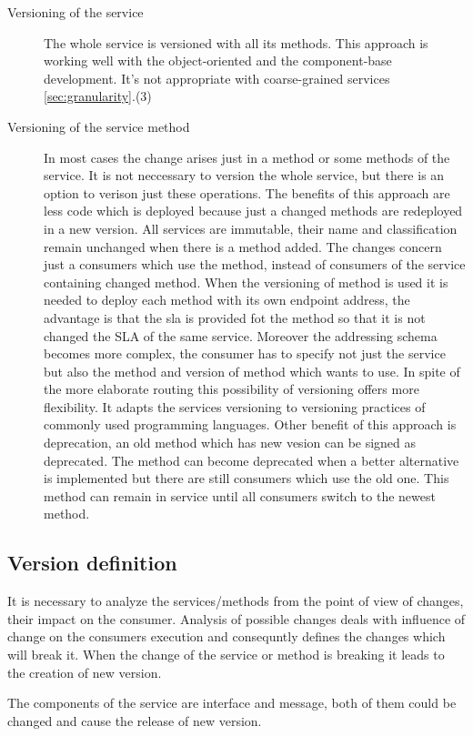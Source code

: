 \begin{description}
  \item[Versioning of the service] 
  The whole service is versioned with all its methods. This approach is working well with the object-oriented and the component-base development. It's not appropriate with coarse-grained services \ref{sec:granularity}.(3)
  \item[Versioning of the service method] 
  In most cases the change arises just in a method or some methods of the service. It is not neccessary to version the whole service, but there is an option to verison just these operations.
  The benefits of this approach are less code which is deployed because just a changed methods are redeployed in a new version. All services are immutable, their name and classification remain unchanged when there is a method added. The changes concern just a consumers which use the method, instead of consumers of the service containing changed method. 
  When the versioning of method is used it is needed to deploy each method with its own endpoint address, the advantage is that the \gls{sla} is provided fot the method so that it is not changed the SLA of the same service.
  Moreover the addressing schema becomes more complex, the consumer has to specify not just the service but also the method and version of method which wants to use.
In spite of the more elaborate routing this possibility of versioning offers more flexibility. It adapts the services versioning to versioning practices of commonly used programming languages. 
Other benefit of this approach is deprecation, an old method which has new vesion can be signed as deprecated. The method can become deprecated when a better alternative is implemented but there are still consumers which use the old one. This method can remain in service until all consumers switch to the newest method.
\end{description}

\subsection{Version definition}
It is necessary to analyze the services/methods from the point of view of changes, their impact on the consumer. Analysis of possible changes deals with influence of change on the consumers execution and consequntly defines the changes which will break it. When the change of the service or method is breaking it leads to the creation of new version.

The components of the service are interface and message, both of them could be changed and cause the release of new version.

